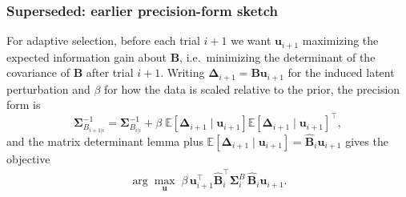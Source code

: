 \documentclass[11pt,letterpaper]{article} %
\newcommand{\inlinecomment}[1]{}
\begin{document}
\subsubsection*{Superseded: earlier precision-form sketch}
\inlinecomment{Kept for reference. This version treated the information increment as $\beta\,\mathbb{E}[\Delta]\mathbb{E}[\Delta]^\top$, which measures the size of the expected perturbation rather than the reduction in posterior uncertainty, and needed a free scaling $\beta$. Superseded by the two criteria above.}
For adaptive selection, before each trial $i+1$ we want $\bm{u}_{i+1}$ maximizing the expected
information gain about $\bm{B}$, i.e.\ minimizing the determinant of the covariance of $\bm{B}$
after trial $i+1$. Writing $\boldsymbol{\Delta}_{i+1} = \bm{B}\bm{u}_{i+1}$ for the induced latent
perturbation and $\beta$ for how the data is scaled relative to the prior, the precision form is
\begin{equation*}
    \boldsymbol{\Sigma}_{B_{i+1|i}}^{-1} = \boldsymbol{\Sigma}_{B_{i|i}}^{-1}
    + \beta \; \mathbb{E}[\boldsymbol{\Delta}_{i+1} \mid \bm{u}_{i+1}]
               \mathbb{E}[\boldsymbol{\Delta}_{i+1} \mid \bm{u}_{i+1}]^\top,
\end{equation*}
and the matrix determinant lemma plus $\mathbb{E}[\boldsymbol{\Delta}_{i+1}\mid\bm{u}_{i+1}] = \hat{\bm{B}}_i\bm{u}_{i+1}$
gives the objective
\begin{align*}
    \arg\max_{\bm{u}}\;\beta\,
    \bm{u}_{i+1}^\top \hat{\bm{B}}_{i}^\top
    \boldsymbol{\Sigma}_{i}^{B}\,
    \hat{\bm{B}}_{i}\bm{u}_{i+1}.
\end{align*}

\clearpage
\end{document}
